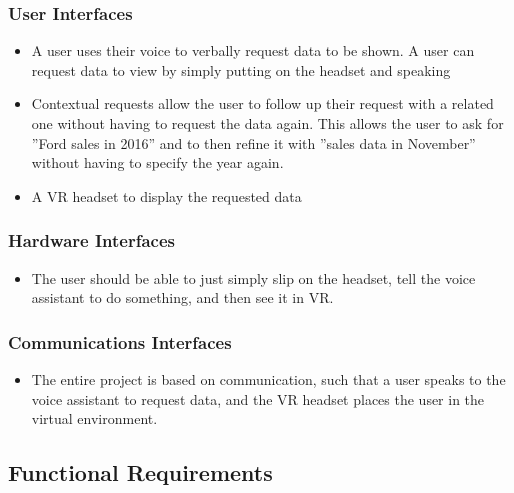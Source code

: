\documentclass[onecolumn, draftclsnofoot,10pt, compsoc]{IEEEtran}
\begin{document}
        \subsubsection{User Interfaces}
            \begin{itemize}
                \item A user uses their voice to verbally request data to be shown. A user can request data to view by simply putting on the headset and speaking
                \item Contextual requests allow the user to follow up their request with a related one without having to request the data again. This allows the user to ask for ''Ford sales in 2016'' and to then refine it with ''sales data in November'' without having to specify the year again.
                \item A VR headset to display the requested data
            \end{itemize}

            \subsubsection{Hardware Interfaces}
            \begin{itemize}
                \item The user should be able to just simply slip on the headset, tell the voice assistant to do something, and then see it in VR.
            \end{itemize}

            \subsubsection{Communications Interfaces}
            \begin{itemize}
                \item The entire project is based on communication, such that a user speaks to the voice assistant to request data, and the VR headset places the user in the virtual environment.
            \end{itemize}

    \subsection{Functional Requirements}
\end{document}
